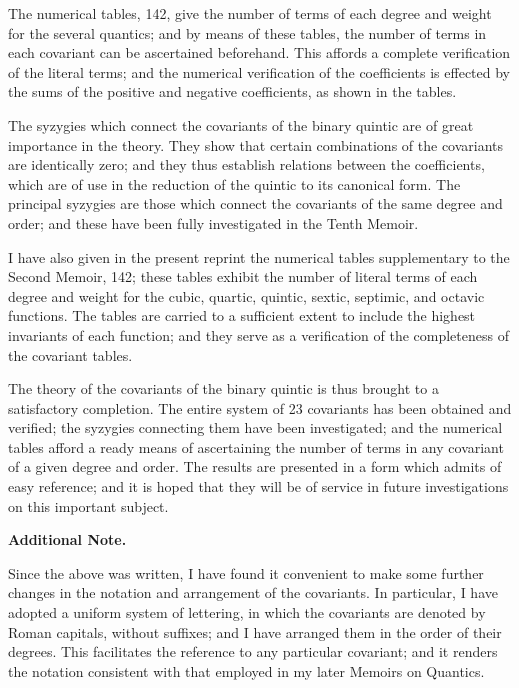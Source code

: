 \documentclass[11pt,a4paper]{article}
\begin{document}
The numerical tables, 142, give the number of terms of each degree and weight for the several quantics; and by means of these tables, the number of terms in each covariant can be ascertained beforehand. This affords a complete verification of the literal terms; and the numerical verification of the coefficients is effected by the sums of the positive and negative coefficients, as shown in the tables.

\clearpage
\setcounter{page}{291}

The syzygies which connect the covariants of the binary quintic are of great importance in the theory. They show that certain combinations of the covariants are identically zero; and they thus establish relations between the coefficients, which are of use in the reduction of the quintic to its canonical form. The principal syzygies are those which connect the covariants of the same degree and order; and these have been fully investigated in the Tenth Memoir.

I have also given in the present reprint the numerical tables supplementary to the Second Memoir, 142; these tables exhibit the number of literal terms of each degree and weight for the cubic, quartic, quintic, sextic, septimic, and octavic functions. The tables are carried to a sufficient extent to include the highest invariants of each function; and they serve as a verification of the completeness of the covariant tables.

The theory of the covariants of the binary quintic is thus brought to a satisfactory completion. The entire system of 23 covariants has been obtained and verified; the syzygies connecting them have been investigated; and the numerical tables afford a ready means of ascertaining the number of terms in any covariant of a given degree and order. The results are presented in a form which admits of easy reference; and it is hoped that they will be of service in future investigations on this important subject.

\clearpage
\setcounter{page}{292}

\begin{center}
\textbf{Additional Note.}
\end{center}

Since the above was written, I have found it convenient to make some further changes in the notation and arrangement of the covariants. In particular, I have adopted a uniform system of lettering, in which the covariants are denoted by Roman capitals, without suffixes; and I have arranged them in the order of their degrees. This facilitates the reference to any particular covariant; and it renders the notation consistent with that employed in my later Memoirs on Quantics.
\end{document}
